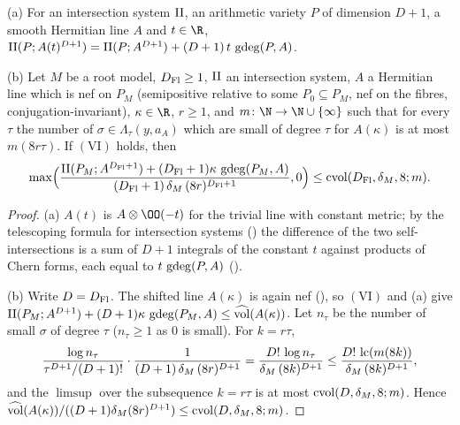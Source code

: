 \begin{lemma}\label{lem:pf:deepstr:shift}
\textup{(a)} For an intersection system $\mathrm{II}$, an arithmetic variety $P$ of dimension $D+1$, a smooth
Hermitian line $A$ and $t\in\R$, $\mathrm{II}(P;A(t)^{D+1})=\mathrm{II}(P;A^{D+1})+(D+1)\,t\,\operatorname{gdeg}(P,A)$.

\textup{(b)} Let $M$ be a root model, $D_{\mathrm{Fl}}\ge1$, $\mathrm{II}$ an intersection system, $A$ a Hermitian line which
is nef on $P_M$ (semipositive relative to some $P_0\subseteq P_M$, nef on the fibres, conjugation-invariant),
$\kappa\in\R$, $r\ge1$, and $m\colon\N\to\N\cup\{\infty\}$ such that for every $\tau$ the number of $\sigma\in\Lambda_\tau(y,a_A)$
which are small of degree $\tau$ for $A(\kappa)$ is at most $m(8r\tau)$. If $\mathrm{(VI)}$ holds, then
\[
\max\Bigl(\frac{\mathrm{II}(P_M;A^{D_{\mathrm{Fl}}+1})+(D_{\mathrm{Fl}}+1)\kappa\,\operatorname{gdeg}(P_M,A)}
{(D_{\mathrm{Fl}}+1)\,\delta_M\,(8r)^{D_{\mathrm{Fl}}+1}},0\Bigr)\le\operatorname{cvol}(D_{\mathrm{Fl}},\delta_M,8;m).
\]
\end{lemma}

\begin{proof}
(a) $A(t)$ is $A\otimes\OO(-t)$ for the trivial line with constant metric; by the telescoping formula for
intersection systems () the difference of the two
self-intersections is a sum of $D+1$ integrals of the constant $t$ against products of Chern forms, each equal
to $t\,\operatorname{gdeg}(P,A)$ ().

(b) Write $D=D_{\mathrm{Fl}}$. The shifted line $A(\kappa)$ is again nef
(), so $\mathrm{(VI)}$ and (a) give
$\mathrm{II}(P_M;A^{D+1})+(D+1)\kappa\,\operatorname{gdeg}(P_M,A)\le\widehat{\operatorname{vol}}(A(\kappa))$. Let $n_\tau$ be the number of small
$\sigma$ of degree $\tau$ ($n_\tau\ge1$ as $0$ is small). For $k=r\tau$,
\[
\frac{\log n_\tau}{\tau^{D+1}/(D+1)!}\cdot\frac1{(D+1)\,\delta_M\,(8r)^{D+1}}
=\frac{D!\,\log n_\tau}{\delta_M\,(8k)^{D+1}}\le\frac{D!\,\operatorname{lc}(m(8k))}{\delta_M\,(8k)^{D+1}},
\]
and the $\limsup$ over the subsequence $k=r\tau$ is at most $\operatorname{cvol}(D,\delta_M,8;m)$. Hence
$\widehat{\operatorname{vol}}(A(\kappa))/((D+1)\delta_M(8r)^{D+1})\le\operatorname{cvol}(D,\delta_M,8;m)$.
\end{proof}

